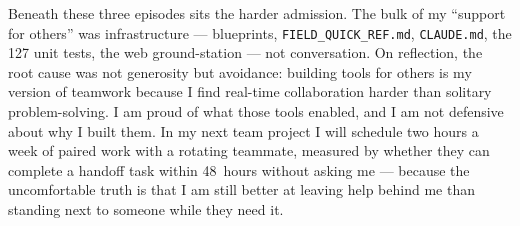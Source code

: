 Beneath these three episodes sits the harder admission. The bulk of my ``support for others'' was infrastructure --- blueprints, \texttt{FIELD\_QUICK\_REF.md}, \texttt{CLAUDE.md}, the 127 unit tests, the web ground-station --- not conversation. On reflection, the root cause was not generosity but avoidance: building tools for others is my version of teamwork because I find real-time collaboration harder than solitary problem-solving. I am proud of what those tools enabled, and I am not defensive about why I built them. In my next team project I will schedule two hours a week of paired work with a rotating teammate, measured by whether they can complete a handoff task within 48~hours without asking me --- because the uncomfortable truth is that I am still better at leaving help behind me than standing next to someone while they need it.

